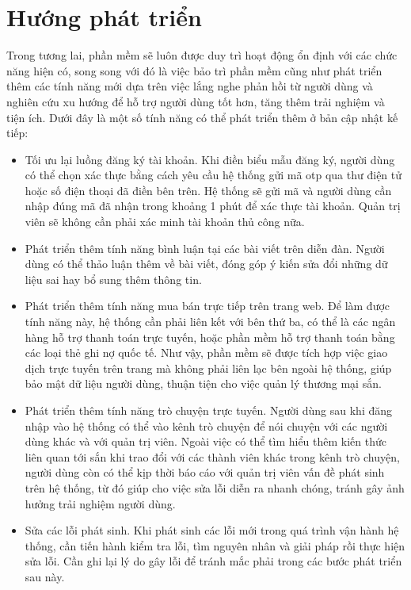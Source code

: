 \documentclass[./../main.tex]{subfiles}
\begin{document}
\section{Hướng phát triển}
Trong tương lai, phần mềm sẽ luôn được duy trì hoạt động ổn định với các chức năng hiện có, song song với đó là việc bảo trì phần mềm cũng như phát triển thêm các tính năng mới dựa trên việc lắng nghe phản hồi từ người dùng và nghiên cứu xu hướng để hỗ trợ người dùng tốt hơn, tăng thêm trải nghiệm và tiện ích. Dưới đây là một số tính năng có thể phát triển thêm ở bản cập nhật kế tiếp: 
\begin{itemize}
    \item Tối ưu lại luồng đăng ký tài khoản.\newline
    Khi điền biểu mẫu đăng ký, người dùng có thể chọn xác thực bằng cách yêu cầu hệ thống gửi mã \acrshort{otp} qua thư điện tử hoặc số điện thoại đã điền bên trên. Hệ thống sẽ gửi mã và người dùng cần nhập đúng mã đã nhận trong khoảng 1 phút để xác thực tài khoản. Quản trị viên sẽ không cần phải xác minh tài khoản thủ công nữa.
    \item Phát triển thêm tính năng bình luận tại các bài viết trên diễn đàn.\newline
    Người dùng có thể thảo luận thêm về bài viết, đóng góp ý kiến sửa đổi những dữ liệu sai hay bổ sung thêm thông tin. 
    \item Phát triển thêm tính năng mua bán trực tiếp trên trang web.\newline
    Để làm được tính năng này, hệ thống cần phải liên kết với bên thứ ba, có thể là các ngân hàng hỗ trợ thanh toán trực tuyến, hoặc phần mềm hỗ trợ thanh toán bằng các loại thẻ ghi nợ quốc tế. Như vậy, phần mềm sẽ được tích hợp việc giao dịch trực tuyến trên trang mà không phải liên lạc bên ngoài hệ thống, giúp bảo mật dữ liệu người dùng, thuận tiện cho việc quản lý thương mại sắn.
    \item Phát triển thêm tính năng trò chuyện trực tuyến.\newline
    Người dùng sau khi đăng nhập vào hệ thống có thể vào kênh trò chuyện để nói chuyện với các người dùng khác và với quản trị viên. Ngoài việc có thể tìm hiểu thêm kiến thức liên quan tới sắn khi trao đổi với các thành viên khác trong kênh trò chuyện, người dùng còn có thể kịp thời báo cáo với quản trị viên vấn đề phát sinh trên hệ thống, từ đó giúp cho việc sửa lỗi diễn ra nhanh chóng, tránh gây ảnh hưởng trải nghiệm người dùng.
    \item Sửa các lỗi phát sinh.\newline
    Khi phát sinh các lỗi mới trong quá trình vận hành hệ thống, cần tiến hành kiểm tra lỗi, tìm nguyên nhân và giải pháp rồi thực hiện sửa lỗi. Cần ghi lại lý do gây lỗi để tránh mắc phải trong các bước phát triển sau này.
\end{itemize}
\end{document}
